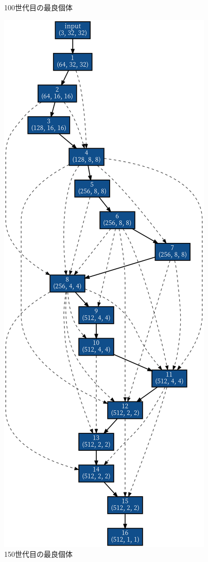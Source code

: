 \documentclass[twocolumn]{jarticle}     %
\begin{document}
\begin{figure}[tb]
\begin{minipage}{0.33\hsize}
\begin{center}
 		\caption{100世代目の最良個体}
 		\label{fig:graph100}
 	\end{center}
 \end{minipage}
 \begin{minipage}{0.33\hsize}
 	\begin{center}
 		\includegraphics[clip,scale=0.2]{150.png}
 		\caption{150世代目の最良個体}
 		\label{fig:graph150}
 	\end{center}
 \end{minipage}
\end{figure}
\end{document}
